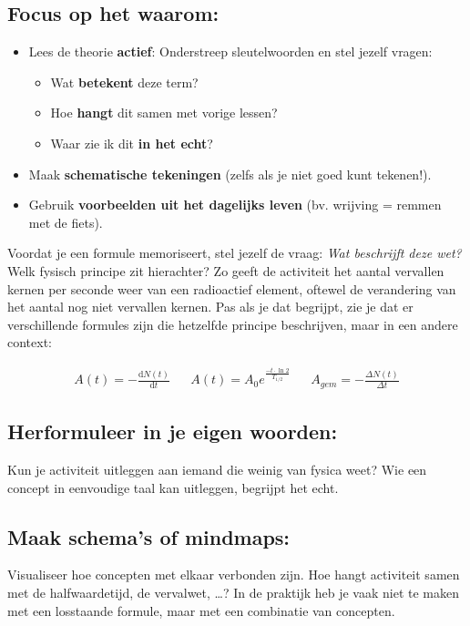 \documentclass{ximera}
\begin{document}
\subsection*{Focus op het waarom:}  
\begin{itemize}
    \item Lees de theorie \textbf{actief}: Onderstreep sleutelwoorden en stel jezelf vragen:
    \begin{itemize}
        \item Wat \textbf{betekent} deze term?
        \item Hoe \textbf{hangt} dit samen met vorige lessen?
        \item Waar zie ik dit \textbf{in het echt}?
    \end{itemize}
    \item Maak \textbf{schematische tekeningen} (zelfs als je niet goed kunt tekenen!).
    \item Gebruik \textbf{voorbeelden uit het dagelijks leven} (bv. wrijving = remmen met de fiets).
\end{itemize}
Voordat je een formule memoriseert, stel jezelf de vraag: \textit{Wat beschrijft deze wet?}  
Welk fysisch principe zit hierachter?  
Zo geeft de activiteit het aantal vervallen kernen per seconde weer van een radioactief element, oftewel de verandering van het aantal nog niet vervallen kernen.  
Pas als je dat begrijpt, zie je dat er verschillende formules zijn die hetzelfde principe beschrijven, maar in een andere context:

\begin{align*}
A(t) = -\frac{\mathrm{d}N(t)}{\mathrm{d}t} && A(t) = A_0 e^{\frac{-t\cdot \ln{2}}{T_{1/2}}} && A_{gem} = -\frac{\Delta N(t)}{\Delta t}
\end{align*}

\subsection*{Herformuleer in je eigen woorden:}
Kun je activiteit uitleggen aan iemand die weinig van fysica weet?  
Wie een concept in eenvoudige taal kan uitleggen, begrijpt het echt.

\subsection*{Maak schema's of mindmaps:}
Visualiseer hoe concepten met elkaar verbonden zijn.  
Hoe hangt activiteit samen met de halfwaardetijd, de vervalwet, \dots?
In de praktijk heb je vaak niet te maken met een losstaande formule, maar met een combinatie van concepten.
\end{document}

